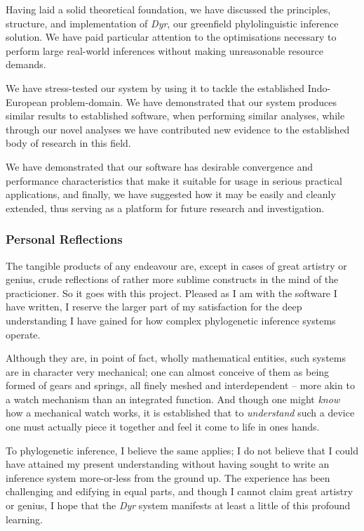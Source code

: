\documentclass[10pt,journal,compsoc]{IEEEtran}
\begin{document}
Having laid a solid theoretical foundation, we have discussed the principles, structure, and implementation of \textit{Dyr}, our greenfield phylolinguistic inference solution. We have paid particular attention to the optimisations necessary to perform large real-world inferences without making unreasonable resource demands.

We have stress-tested our system by using it to tackle the established Indo-European problem-domain. We have demonstrated that our system produces similar results to established software, when performing similar analyses, while through our novel analyses we have contributed new evidence to the established body of research in this field.

We have demonstrated that our software has desirable convergence and performance characteristics that make it suitable for usage in serious practical applications, and finally, we have suggested how it may be easily and cleanly extended, thus serving as a platform for future research and investigation.

\subsubsection{Personal Reflections}

The tangible products of any endeavour are, except in cases of great artistry or genius, crude reflections of rather more sublime constructs in the mind of the practicioner. So it goes with this project. Pleased as I am with the software I have written, I reserve the larger part of my satisfaction for the deep understanding I have gained for how complex phylogenetic inference systems operate.

Although they are, in point of fact, wholly mathematical entities, such systems are in character very mechanical; one can almost conceive of them as being formed of gears and springs, all finely meshed and interdependent -- more akin to a watch mechanism than an integrated function. And though one might \textit{know} how a mechanical watch works, it is established that to \textit{understand} such a device one must actually piece it together and feel it come to life in ones hands.

To phylogenetic inference, I believe the same applies; I do not believe that I could have attained my present understanding without having sought to write an inference system more-or-less from the ground up. The experience has been challenging and edifying in equal parts, and though I cannot claim great artistry or genius, I hope that the \textit{Dyr} system manifests at least a little of this profound learning.



\end{document}
